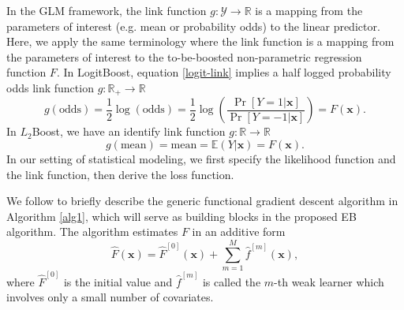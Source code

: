 \documentclass[11pt]{article}
\numberwithin{equation}{section}
\def\R{{\mathbb R}}  %
\def\E{{\mathbb E}}  %
\def\bx{\boldsymbol{x}}
\begin{document}
In the GLM framework, the link function $g:\mathcal{Y}\rightarrow\R$ is a mapping from the parameters of interest (e.g. mean or probability odds) to  the linear predictor.
Here, we apply the same terminology where the link function is a mapping from the parameters of interest to the to-be-boosted non-parametric regression function $F$.
In LogitBoost, equation \eqref{logit-link} implies a half logged probability odds link function $g:\R_+\rightarrow\R$ 
$$g(\text{odds})=\frac{1}{2}\log(\text{odds})=\frac{1}{2}\log\left(\frac{\Pr[Y=1|\bx]}{\Pr[Y=-1|\bx]}\right)=F(\bx).$$
In $L_2$Boost, we have an identify link function $g:\R\rightarrow\R$
$$g(\text{mean})=\text{mean}=\E(Y|\bx)=F(\bx).$$
In our setting of statistical modeling, we first specify the likelihood function and the link function, then derive the loss function.



We follow \citet{buehlmann:2003} to briefly describe the generic functional gradient descent algorithm in Algorithm \ref{alg1}, which will serve as building blocks in the proposed EB algorithm. 
The algorithm estimates $F$ in an additive form
$$\hat{F}(\bx)=\hat{F}^{[0]}(\bx)+\sum_{m=1}^M\hat{f}^{[m]}(\bx),$$
where $\hat{F}^{[0]}$ is the initial value and $\hat{f}^{[m]}$ is called the $m$-th weak learner which involves only a small number of covariates.
\end{document}
